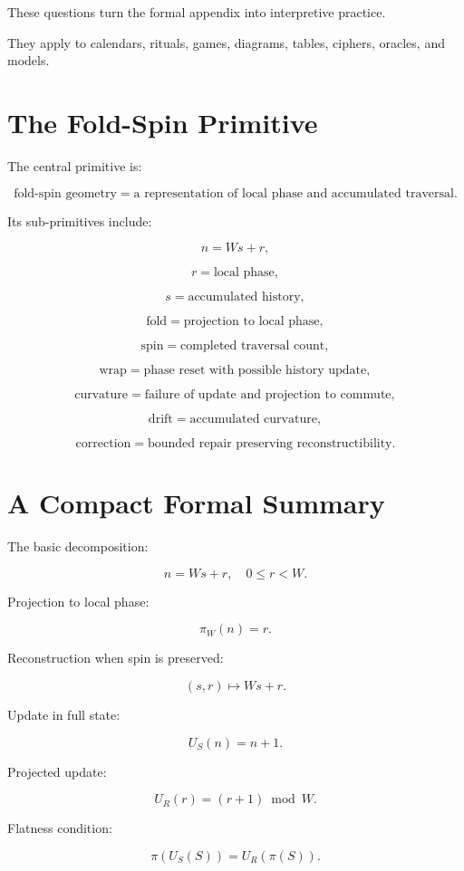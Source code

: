 \documentclass[11pt]{book}
\begin{document}
These questions turn the formal appendix into interpretive practice.

They apply to calendars, rituals, games, diagrams, tables, ciphers, oracles, and models.

\section{The Fold-Spin Primitive}

The central primitive is:

\[
\text{fold-spin geometry} = \text{a representation of local phase and accumulated traversal}.
\]

Its sub-primitives include:

\[
n = Ws + r,
\]

\[
r = \text{local phase},
\]

\[
s = \text{accumulated history},
\]

\[
\text{fold} = \text{projection to local phase},
\]

\[
\text{spin} = \text{completed traversal count},
\]

\[
\text{wrap} = \text{phase reset with possible history update},
\]

\[
\text{curvature} = \text{failure of update and projection to commute},
\]

\[
\text{drift} = \text{accumulated curvature},
\]

\[
\text{correction} = \text{bounded repair preserving reconstructibility}.
\]

\section{A Compact Formal Summary}

The basic decomposition:

\[
n = Ws + r,
\quad
0 \leq r < W.
\]

Projection to local phase:

\[
\pi_W(n)=r.
\]

Reconstruction when spin is preserved:

\[
(s,r) \mapsto Ws+r.
\]

Update in full state:

\[
U_S(n)=n+1.
\]

Projected update:

\[
U_R(r)=(r+1)\bmod W.
\]

Flatness condition:

\[
\pi(U_S(S)) = U_R(\pi(S)).
\]
\end{document}
